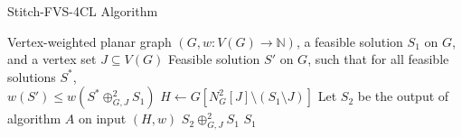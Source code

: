 \documentclass{beamer}
\begin{document}
\begin{frame}[fragile]{Stitch-FVS-4CL Algorithm}
  \begin{algorithm}[H]
  \caption{Stitch-FVS-4CL}
    \begin{algorithmic}[1]
      \REQUIRE Vertex-weighted planar graph $(G, w:V(G) \to \mathbb{N})$, a feasible solution $S_1$ on $G$, and a vertex set $J \subseteq V(G)$
      \ENSURE Feasible solution $S'$ on $G$, such that for all feasible solutions $S^*$,\\
      \hspace{0.5em} $w(S') \leq w(S^* \oplus^{2}_{G,J} S_1)$
      \STATE $H \leftarrow G[N^{2}_{G}[J] \setminus (S_1 \setminus J)]$
      \STATE Let $S_2$ be the output of algorithm $A$ on input $(H, w)$
          \RETURN $S_2 \oplus^{2}_{G,J} S_1$
      \ELSE
          \RETURN $S_1$
      \ENDIF
    \end{algorithmic}
  \end{algorithm}
\end{frame}
\end{document}
